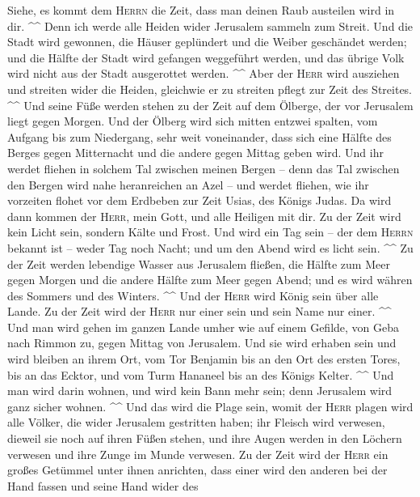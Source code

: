  Siehe, es kommt dem \textsc{Herrn} die Zeit, dass man
deinen Raub austeilen wird in dir. \^{}\^{}  Denn ich
werde alle Heiden wider Jerusalem sammeln zum Streit. Und die Stadt wird
gewonnen, die Häuser geplündert und die Weiber geschändet werden; und
die Hälfte der Stadt wird gefangen weggeführt werden, und das übrige
Volk wird nicht aus der Stadt ausgerottet werden. \^{}\^{}
 Aber der \textsc{Herr} wird ausziehen und streiten wider
die Heiden, gleichwie er zu streiten pflegt zur Zeit des Streites.
\^{}\^{}  Und seine Füße werden stehen zu der Zeit auf dem
Ölberge, der vor Jerusalem liegt gegen Morgen. Und der Ölberg wird sich
mitten entzwei spalten, vom Aufgang bis zum Niedergang, sehr weit
voneinander, dass sich eine Hälfte des Berges gegen Mitternacht und die
andere gegen Mittag geben wird.  Und ihr werdet fliehen in
solchem Tal zwischen meinen Bergen -- denn das Tal zwischen den Bergen
wird nahe heranreichen an Azel -- und werdet fliehen, wie ihr vorzeiten
flohet vor dem Erdbeben zur Zeit Usias, des Königs Judas. Da wird dann
kommen der \textsc{Herr}, mein Gott, und alle Heiligen mit dir.
 Zu der Zeit wird kein Licht sein, sondern Kälte und
Frost.  Und wird ein Tag sein -- der dem \textsc{Herrn}
bekannt ist -- weder Tag noch Nacht; und um den Abend wird es licht
sein. \^{}\^{}  Zu der Zeit werden lebendige Wasser aus
Jerusalem fließen, die Hälfte zum Meer gegen Morgen und die andere
Hälfte zum Meer gegen Abend; und es wird währen des Sommers und des
Winters. \^{}\^{}  Und der \textsc{Herr} wird König sein
über alle Lande. Zu der Zeit wird der \textsc{Herr} nur einer sein und
sein Name nur einer. \^{}\^{}  Und man wird gehen im
ganzen Lande umher wie auf einem Gefilde, von Geba nach Rimmon zu, gegen
Mittag von Jerusalem. Und sie wird erhaben sein und wird bleiben an
ihrem Ort, vom Tor Benjamin bis an den Ort des ersten Tores, bis an das
Ecktor, und vom Turm Hananeel bis an des Königs Kelter. \^{}\^{}
 Und man wird darin wohnen, und wird kein Bann mehr sein;
denn Jerusalem wird ganz sicher wohnen. \^{}\^{}  Und das
wird die Plage sein, womit der \textsc{Herr} plagen wird alle Völker,
die wider Jerusalem gestritten haben; ihr Fleisch wird verwesen, dieweil
sie noch auf ihren Füßen stehen, und ihre Augen werden in den Löchern
verwesen und ihre Zunge im Munde verwesen.  Zu der Zeit
wird der \textsc{Herr} ein großes Getümmel unter ihnen anrichten, dass
einer wird den anderen bei der Hand fassen und seine Hand wider des
